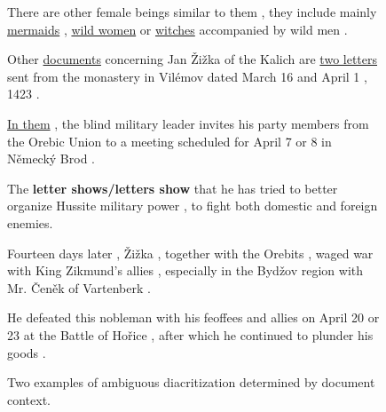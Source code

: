 \documentclass{pbmlarxiv}
\newenvironment{framedexample}{\begin{center}\begin{minipage}[c]{1\hsize}\setlength{\FrameSep}{5pt}\begin{framed}\setlength{\parskip}{4pt}}{\end{framed}\end{minipage}\end{center}}
\begin{document}
\begin{figure}[p]
\begin{framedexample}
There are other female beings similar to them , they include mainly \uline{mermaids} , \uline{wild women} or \uline{witches} accompanied by wild men .

\leavevmode

Other \uline{documents} concerning Jan Žižka of the Kalich are \uline{two letters} sent from the monastery in Vilémov dated March 16 and April 1 , 1423 .  

\uline{In them} , the blind military leader invites his party members from the Orebic Union to a meeting scheduled for April 7 or 8 in Německý Brod . 

The \textbf{letter shows/letters show} that he has tried to better organize Hussite military power , to fight both domestic and foreign enemies.

Fourteen days later , Žižka , together with the Orebits , waged war with King Zikmund's allies , especially in the Bydžov region with Mr. Čeněk of Vartenberk .

He defeated this nobleman with his feoffees and allies on April 20 or 23 at the Battle of Hořice , after which he continued to plunder his goods . 
\end{framedexample}

    \caption{Two examples of ambiguous diacritization determined by document context.}
    \label{table:sentence_vs_whole_context_examples}
\end{figure}

\newcommand{\subcaption}[2][1.5em]{\vspace{.2em}\\\multicolumn{3}{c}{#2}\vspace{#1}}
\end{document}
